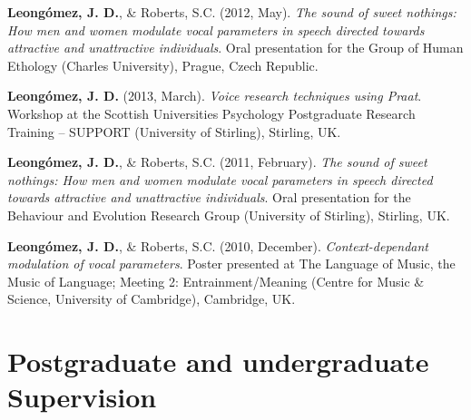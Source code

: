 \documentclass[11pt, a4paper]{awesome-cv}
\begin{document}
\textbf{Leongómez, J. D.}, \& Roberts, S.C. (2012, May). \emph{The sound
of sweet nothings: How men and women modulate vocal parameters in speech
directed towards attractive and unattractive individuals}. Oral
presentation for the Group of Human Ethology (Charles University),
Prague, Czech Republic.

\textbf{Leongómez, J. D.} (2013, March). \emph{Voice research techniques
using Praat}. Workshop at the Scottish Universities Psychology
Postgraduate Research Training -- SUPPORT (University of Stirling),
Stirling, UK.

\textbf{Leongómez, J. D.}, \& Roberts, S.C. (2011, February). \emph{The
sound of sweet nothings: How men and women modulate vocal parameters in
speech directed towards attractive and unattractive individuals}. Oral
presentation for the Behaviour and Evolution Research Group (University
of Stirling), Stirling, UK.

\textbf{Leongómez, J. D.}, \& Roberts, S.C. (2010, December).
\emph{Context-dependant modulation of vocal parameters}. Poster
presented at The Language of Music, the Music of Language; Meeting 2:
Entrainment/Meaning (Centre for Music \& Science, University of
Cambridge), Cambridge, UK.

\endgroup

\hypertarget{postgraduate-and-undergraduate-supervision}{%
\section{Postgraduate and undergraduate
Supervision}\label{postgraduate-and-undergraduate-supervision}}
\end{document}
